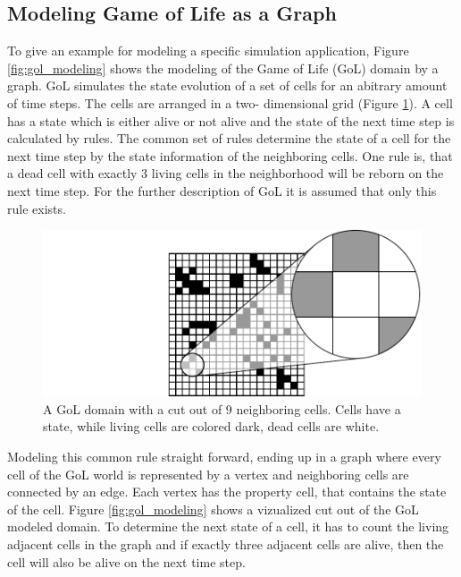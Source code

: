 \subsection{Modeling Game of Life as a Graph}
\label{sec:gol}
To give an example for modeling a specific simulation application,
Figure \ref{fig:gol_modeling} shows the modeling of the Game of Life (GoL) \cite{ref:gol}
domain by a graph. GoL simulates the state evolution of a set of cells for
an abitrary amount of time steps. The cells are arranged in a two-
dimensional grid (Figure \ref{fig:gol_simulation}).  A cell has a
state which is either alive or not alive and the state of the next
time step is calculated by rules. The common set of rules determine
the state of a cell for the next time step by the state information of
the neighboring cells. One rule is, that a dead cell with
exactly 3 living cells in the neighborhood will be reborn on the next
time step. For the further description of GoL it is assumed that only
this rule exists.

\begin{figure}[H]
  \centering \includegraphics[width=\textwidth]{graphics/30_gol_simulation}
  \caption{A GoL domain with a cut out of 9 neighboring cells. Cells have
  a state, while living cells are colored dark, dead cells are white.}
  \label{fig:gol_simulation}
\end{figure}

Modeling this common rule straight forward, ending up in a graph where
every cell of the GoL world is represented by a vertex and neighboring
cells are connected by an edge. Each vertex has the property cell, that
contains the state of the cell. Figure \ref{fig:gol_modeling} shows a vizualized
cut out of the GoL modeled domain. To determine the next state of a 
cell, it has to count the living adjacent cells in the graph and if
exactly three adjacent cells are alive, then the cell will also be
alive on the next time step.

